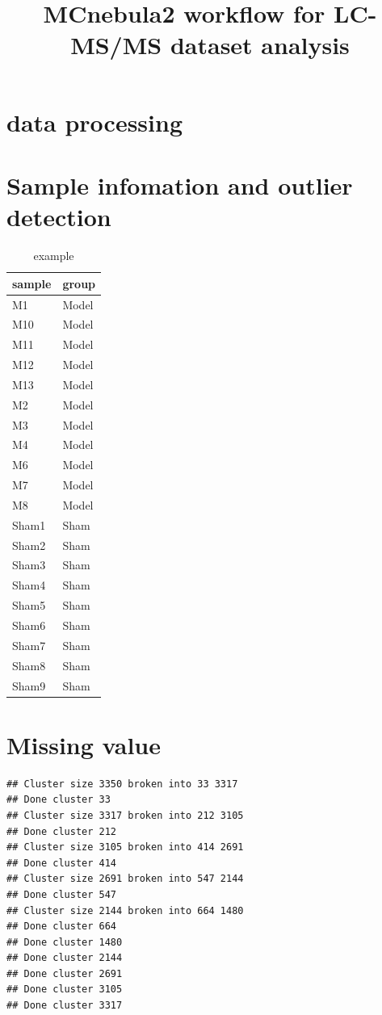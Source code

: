 \documentclass[
]{article}
\title{MCnebula2 workflow for LC-MS/MS dataset analysis}
\author{}
\date{\vspace{-2.5em}}
\begin{document}
\maketitle

{
\setcounter{tocdepth}{3}
\tableofcontents
}
\section{data processing}\label{data-processing}

\section{Sample infomation and outlier detection}\label{sample-infomation-and-outlier-detection}

\begin{table}[!h]
\centering
\caption{\label{tab:unnamed-chunk-3}example}
\centering
\begin{tabular}[t]{ll}
\toprule
sample & group\\
\midrule
M1 & Model\\
M10 & Model\\
M11 & Model\\
M12 & Model\\
M13 & Model\\
\addlinespace
M2 & Model\\
M3 & Model\\
M4 & Model\\
M6 & Model\\
M7 & Model\\
\addlinespace
M8 & Model\\
Sham1 & Sham\\
Sham2 & Sham\\
Sham3 & Sham\\
Sham4 & Sham\\
\addlinespace
Sham5 & Sham\\
Sham6 & Sham\\
Sham7 & Sham\\
Sham8 & Sham\\
Sham9 & Sham\\
\bottomrule
\end{tabular}
\end{table}

\section{Missing value}\label{missing-value}

\begin{verbatim}
## Cluster size 3350 broken into 33 3317 
## Done cluster 33 
## Cluster size 3317 broken into 212 3105 
## Done cluster 212 
## Cluster size 3105 broken into 414 2691 
## Done cluster 414 
## Cluster size 2691 broken into 547 2144 
## Done cluster 547 
## Cluster size 2144 broken into 664 1480 
## Done cluster 664 
## Done cluster 1480 
## Done cluster 2144 
## Done cluster 2691 
## Done cluster 3105 
## Done cluster 3317
\end{verbatim}
\end{document}

